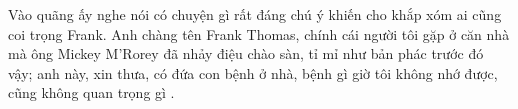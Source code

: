 Vào quãng ấy nghe nói có chuyện gì rất đáng chú ý khiến cho khắp xóm ai cũng coi trọng Frank. Anh chàng tên Frank Thomas, chính cái người tôi gặp ở căn nhà mà ông Mickey M'Rorey đã nhảy điệu chào sàn, tỉ mỉ như bản phác trước đó vậy; anh này, xin thưa, có đứa con bệnh ở nhà, bệnh gì giờ tôi không nhớ được, cũng không quan trọng gì .

